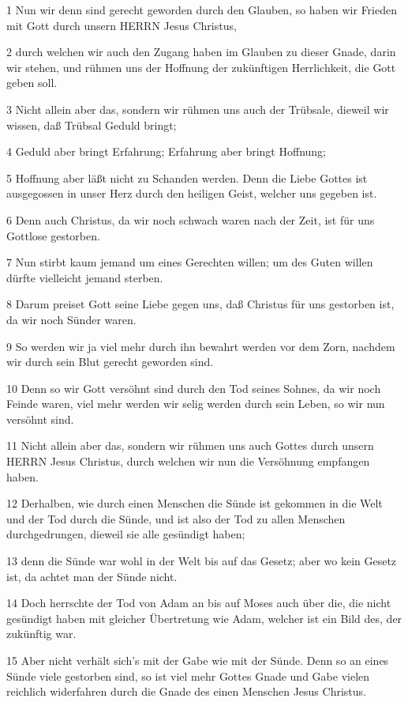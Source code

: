\par 1 Nun wir denn sind gerecht geworden durch den Glauben, so haben wir Frieden mit Gott durch unsern HERRN Jesus Christus,
\par 2 durch welchen wir auch den Zugang haben im Glauben zu dieser Gnade, darin wir stehen, und rühmen uns der Hoffnung der zukünftigen Herrlichkeit, die Gott geben soll.
\par 3 Nicht allein aber das, sondern wir rühmen uns auch der Trübsale, dieweil wir wissen, daß Trübsal Geduld bringt;
\par 4 Geduld aber bringt Erfahrung; Erfahrung aber bringt Hoffnung;
\par 5 Hoffnung aber läßt nicht zu Schanden werden. Denn die Liebe Gottes ist ausgegossen in unser Herz durch den heiligen Geist, welcher uns gegeben ist.
\par 6 Denn auch Christus, da wir noch schwach waren nach der Zeit, ist für uns Gottlose gestorben.
\par 7 Nun stirbt kaum jemand um eines Gerechten willen; um des Guten willen dürfte vielleicht jemand sterben.
\par 8 Darum preiset Gott seine Liebe gegen uns, daß Christus für uns gestorben ist, da wir noch Sünder waren.
\par 9 So werden wir ja viel mehr durch ihn bewahrt werden vor dem Zorn, nachdem wir durch sein Blut gerecht geworden sind.
\par 10 Denn so wir Gott versöhnt sind durch den Tod seines Sohnes, da wir noch Feinde waren, viel mehr werden wir selig werden durch sein Leben, so wir nun versöhnt sind.
\par 11 Nicht allein aber das, sondern wir rühmen uns auch Gottes durch unsern HERRN Jesus Christus, durch welchen wir nun die Versöhnung empfangen haben.
\par 12 Derhalben, wie durch einen Menschen die Sünde ist gekommen in die Welt und der Tod durch die Sünde, und ist also der Tod zu allen Menschen durchgedrungen, dieweil sie alle gesündigt haben;
\par 13 denn die Sünde war wohl in der Welt bis auf das Gesetz; aber wo kein Gesetz ist, da achtet man der Sünde nicht.
\par 14 Doch herrschte der Tod von Adam an bis auf Moses auch über die, die nicht gesündigt haben mit gleicher Übertretung wie Adam, welcher ist ein Bild des, der zukünftig war.
\par 15 Aber nicht verhält sich's mit der Gabe wie mit der Sünde. Denn so an eines Sünde viele gestorben sind, so ist viel mehr Gottes Gnade und Gabe vielen reichlich widerfahren durch die Gnade des einen Menschen Jesus Christus.
